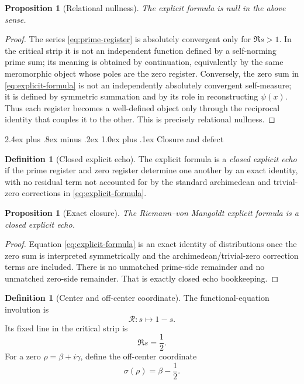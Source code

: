 \documentclass[11pt,a4paper]{article}
\makeatletter
\theoremstyle{plain}
\newtheorem{proposition}[theorem]{Proposition}
\theoremstyle{definition}
\newtheorem{definition}[theorem]{Definition}
\theoremstyle{remark}
\numberwithin{equation}{section}
\newcommand{\Rop}{\mathcal{R}}
\renewcommand{\subsection}{%
  \@startsection{subsection}{2}{0pt}%
    {2.4ex plus .8ex minus .2ex}%
    {1.0ex plus .1ex}%
    {\normalfont\Large\bfseries\color{headingAccent}}%
}
\makeatother
\begin{document}
\begin{proposition}[Relational nullness]
\label{prop:explicit-null}
The explicit formula is null in the above sense.
\end{proposition}

\begin{proof}
The series \eqref{eq:prime-register} is absolutely convergent only for
\(\Re s>1\).  In the critical strip it is not an independent function
defined by a self-norming prime sum; its meaning is obtained by
continuation, equivalently by the same meromorphic object whose poles
are the zero register.  Conversely, the zero sum in
\eqref{eq:explicit-formula} is not an independently absolutely
convergent self-measure; it is defined by symmetric summation and by its
role in reconstructing \(\psi(x)\).  Thus each register becomes a
well-defined object only through the reciprocal identity that couples it
to the other.  This is precisely relational nullness.
\end{proof}

\subsection{Closure and defect}

\begin{definition}[Closed explicit echo]
The explicit formula is a \emph{closed explicit echo} if the prime
register and zero register determine one another by an exact identity,
with no residual term not accounted for by the standard archimedean and
trivial-zero corrections in \eqref{eq:explicit-formula}.
\end{definition}

\begin{proposition}[Exact closure]
\label{prop:explicit-closure}
The Riemann--von Mangoldt explicit formula is a closed explicit echo.
\end{proposition}

\begin{proof}
Equation \eqref{eq:explicit-formula} is an exact identity of
distributions once the zero sum is interpreted symmetrically and the
archimedean/trivial-zero correction terms are included.  There is no
unmatched prime-side remainder and no unmatched zero-side remainder.
That is exactly closed echo bookkeeping.
\end{proof}

\medskip
\begin{definition}[Center and off-center coordinate]
The functional-equation involution is
\[
  \Rop:s\mapsto1-s.
\]
Its fixed line in the critical strip is
\[
  \Re s=\frac12.
\]
For a zero \(\rho=\beta+i\gamma\), define the off-center coordinate
\[
  \sigma(\rho)=\beta-\frac12.
\]
\end{definition}
\end{document}
